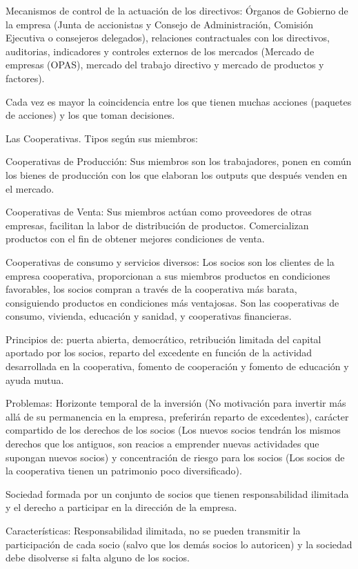 \documentclass[12pt, twoside, openright]{report} %
\begin{document}
Mecanismos de control de la actuación de los directivos: Órganos de Gobierno de la empresa (Junta de accionistas y Consejo de Administración, Comisión Ejecutiva o consejeros delegados), relaciones contractuales con los directivos, auditorias, indicadores y controles externos de los mercados (Mercado de empresas (OPAS), mercado del trabajo directivo y mercado de productos y factores).

Cada vez es mayor la coincidencia entre los que tienen muchas acciones (paquetes de acciones) y los que toman decisiones.

Las Cooperativas. Tipos según sus miembros:

Cooperativas de Producción: Sus miembros son los trabajadores, ponen en común los bienes de producción con los que elaboran los outputs que después venden en el mercado.

Cooperativas de Venta: Sus miembros actúan como proveedores de otras empresas, facilitan la labor de distribución de productos. Comercializan productos con el fin de obtener mejores condiciones de venta.

Cooperativas de consumo y servicios diversos: Los socios son los clientes de la empresa cooperativa, proporcionan a sus miembros productos en condiciones favorables, los socios compran a través de la cooperativa más barata, consiguiendo productos en condiciones más ventajosas. Son las cooperativas de consumo, vivienda, educación y sanidad, y cooperativas financieras.

Principios de: puerta abierta, democrático, retribución limitada del capital aportado por los socios, reparto del excedente en función de la actividad desarrollada en la cooperativa, fomento de cooperación y fomento de educación y ayuda mutua.

Problemas: Horizonte temporal de la inversión (No motivación para invertir más allá de su permanencia en la empresa, preferirán reparto de excedentes), carácter compartido de los derechos de los socios (Los nuevos socios tendrán los mismos derechos que los antiguos, son reacios a emprender nuevas actividades que supongan nuevos socios) y concentración de riesgo para los socios (Los socios de la cooperativa tienen un patrimonio poco diversificado).

Sociedad formada por un conjunto de socios que tienen responsabilidad ilimitada y el derecho a participar en la dirección de la empresa.

Características: Responsabilidad ilimitada, no se pueden transmitir la participación de cada socio (salvo que los demás socios lo autoricen) y la sociedad debe disolverse si falta alguno de los socios.
\end{document}
